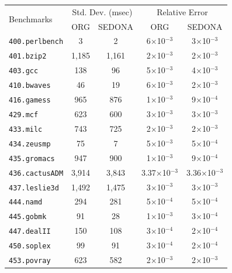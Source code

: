 \documentclass[letter]{ieice}
\begin{document}

\vspace{-0.1in}
\begin{table}[h]
\centering
{\scriptsize
\begin{tabular}{l|cc|cc} \hline
\multirow{2}{*}{Benchmarks} 
  & \multicolumn{2}{c|}{Std. Dev. (msec)} 
  & \multicolumn{2}{c}{Relative Error}\\ \cline{2-5}
  & {ORG} & {SEDONA} & {ORG} & {SEDONA}\\ \hline		
{{\tt 400.perlbench}} & {3} 	& {2} & {6$\times$10$^{-3}$} & {3$\times$10$^{-3}$}\\
{{\tt 401.bzip2}} & {1,185} & {1,161} & {2$\times$10$^{-3}$} & {2$\times$10$^{-3}$}\\
{{\tt 403.gcc}} & {138} & {96} & {5$\times$10$^{-3}$} & {4$\times$10$^{-3}$}\\
{{\tt 410.bwaves}} & {46} & {19} & {6$\times$10$^{-3}$} & {2$\times$10$^{-3}$}\\
{{\tt 416.gamess}} & {965} & {876} & {1$\times$10$^{-3}$} & {9$\times$10$^{-4}$}\\%
{{\tt 429.mcf}} & {623} & {600} & {3$\times$10$^{-3}$} & {3$\times$10$^{-3}$}\\
{{\tt 433.milc}} & {743} & {725} & {2$\times$10$^{-3}$} & {2$\times$10$^{-3}$}\\ %
{{\tt 434.zeusmp}} & {75} & {7} & {5$\times$10$^{-3}$} & {5$\times$10$^{-4}$}\\
{{\tt 435.gromacs}} & {947} & {900} & {1$\times$10$^{-3}$} & {9$\times$10$^{-4}$}\\
{{\tt 436.cactusADM}} & {3,914} & {3,843} & {3.37$\times$10$^{-3}$} & {3.36$\times$10$^{-3}$}\\
{{\tt 437.leslie3d}} & {1,492} & {1,475}  & {3$\times$10$^{-3}$} & {3$\times$10$^{-3}$}\\
{{\tt 444.namd}} & {294} & {281}  & {5$\times$10$^{-4}$} & {5$\times$10$^{-4}$}\\
{{\tt 445.gobmk}} & {91} & {28}  & {1$\times$10$^{-3}$} & {3$\times$10$^{-4}$}\\
{{\tt 447.dealII}} & {150} & {108}  & {3$\times$10$^{-4}$} & {2$\times$10$^{-4}$}\\
{{\tt 450.soplex}} & {99} & {91}  & {3$\times$10$^{-4}$} & {2$\times$10$^{-4}$}\\
{{\tt 453.povray}} & {623} & {582}  & {2$\times$10$^{-3}$} & {2$\times$10$^{-3}$}\\

\end{tabular}}
\end{table}
\end{document}
